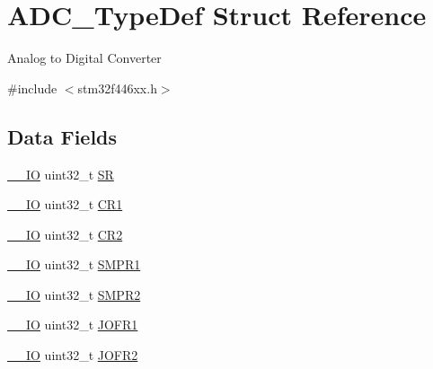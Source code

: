 \hypertarget{struct_a_d_c___type_def}{}\section{A\+D\+C\+\_\+\+Type\+Def Struct Reference}
\label{struct_a_d_c___type_def}


Analog to Digital Converter ~\newline
  




{\ttfamily \#include $<$stm32f446xx.\+h$>$}

\subsection*{Data Fields}
\begin{DoxyCompactItemize}
\item 
\mbox{\hyperlink{core__sc300_8h_aec43007d9998a0a0e01faede4133d6be}{\+\_\+\+\_\+\+IO}} uint32\+\_\+t \mbox{\hyperlink{struct_a_d_c___type_def_af6aca2bbd40c0fb6df7c3aebe224a360}{SR}}
\item 
\mbox{\hyperlink{core__sc300_8h_aec43007d9998a0a0e01faede4133d6be}{\+\_\+\+\_\+\+IO}} uint32\+\_\+t \mbox{\hyperlink{struct_a_d_c___type_def_ab0ec7102960640751d44e92ddac994f0}{C\+R1}}
\item 
\mbox{\hyperlink{core__sc300_8h_aec43007d9998a0a0e01faede4133d6be}{\+\_\+\+\_\+\+IO}} uint32\+\_\+t \mbox{\hyperlink{struct_a_d_c___type_def_afdfa307571967afb1d97943e982b6586}{C\+R2}}
\item 
\mbox{\hyperlink{core__sc300_8h_aec43007d9998a0a0e01faede4133d6be}{\+\_\+\+\_\+\+IO}} uint32\+\_\+t \mbox{\hyperlink{struct_a_d_c___type_def_af9d6c604e365c7d9d7601bf4ef373498}{S\+M\+P\+R1}}
\item 
\mbox{\hyperlink{core__sc300_8h_aec43007d9998a0a0e01faede4133d6be}{\+\_\+\+\_\+\+IO}} uint32\+\_\+t \mbox{\hyperlink{struct_a_d_c___type_def_a6ac83fae8377c7b7fcae50fa4211b0e8}{S\+M\+P\+R2}}
\item 
\mbox{\hyperlink{core__sc300_8h_aec43007d9998a0a0e01faede4133d6be}{\+\_\+\+\_\+\+IO}} uint32\+\_\+t \mbox{\hyperlink{struct_a_d_c___type_def_a427dda1678f254bd98b1f321d7194a3b}{J\+O\+F\+R1}}
\item 
\mbox{\hyperlink{core__sc300_8h_aec43007d9998a0a0e01faede4133d6be}{\+\_\+\+\_\+\+IO}} uint32\+\_\+t \mbox{\hyperlink{struct_a_d_c___type_def_a11e65074b9f06b48c17cdfa5bea9f125}{J\+O\+F\+R2}}
\item 

\end{DoxyCompactItemize}

